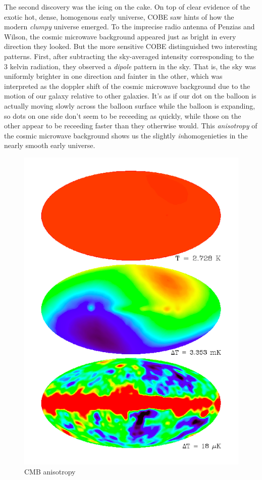 The second discovery was the icing on the cake. On top of clear evidence of the exotic hot, dense, homogenous early universe, COBE saw hints of how the modern \textit{clumpy} universe emerged. To the imprecise radio antenna of Penzias and Wilson, the cosmic microwave background appeared just as bright in every direction they looked. But the more sensitive COBE distinguished two interesting patterns. First, after subtracting the sky-averaged intensity corresponding to the 3 kelvin radiation, they observed a \textit{dipole} pattern in the sky. That is, the sky was uniformly brighter in one direction and fainter in the other, which was interpreted as the doppler shift of the cosmic microwave background due to the motion of our galaxy relative to other galaxies. It's as if our dot on the balloon is actually moving slowly across the balloon surface while the balloon is expanding, so dots on one side don't seem to be receeding as quickly, while those on the other appear to be receeding faster than they otherwise would. This \textit{anisotropy} of the cosmic microwave background shows us the slightly \textit{in}homogenieties in the nearly smooth early universe. 

\begin{figure}
\includegraphics[width=6in]{cocktail_party_intro/cobe_cmb_anisotropy.png}
\caption{CMB anisotropy}
\label{fig:cobecmbanisotropy}
\end{figure}

